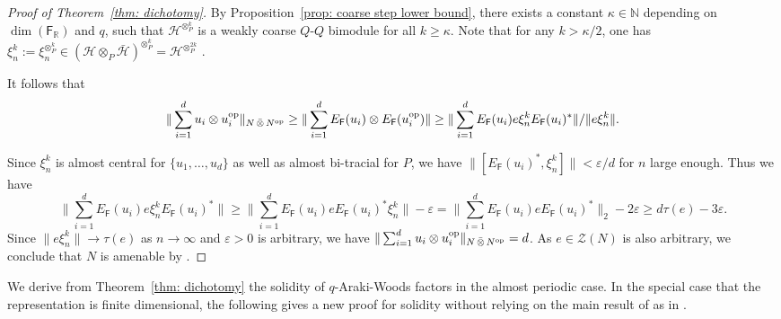 \documentclass[a4paper,11pt]{amsart}
\theoremstyle{definition}
\newtheorem{rem}[thm]{Remark}
\newcommand{\N}{{\mathbb N}}
\newcommand{\R}{{\mathbb R}}
\newcommand{\cH}{{\mathcal H}}
\newcommand{\cM}{{\mathcal M}}
\newcommand{\cO}{{\mathcal O}}
\newcommand{\cU}{{\mathcal U}}
\newcommand{\cZ}{{\mathcal Z}}
\newcommand{\sH}{\mathsf{H}}
\newcommand{\sF}{\mathsf{F}}
\newcommand{\ot}{\otimes}
\newcommand{\ovt}{\, \bar{\otimes}\,}
\newcommand{\op}{{\rm op}}
\begin{document}
\begin{proof}[Proof of Theorem~\ref{thm: dichotomy}]
By Proposition~\ref{prop: coarse step lower bound}, there exists a constant $\kappa\in \N$ depending on $\dim(\sF_\R)$ and $q$,
	such that $\cH^{\ot_P^k}$ is a weakly coarse $Q$-$Q$ bimodule for all $k\geq \kappa$.
Note that for any $k>\kappa/2$, one has 
	$\xi_n^k:=\xi_n^{\ot_P^k}\in (\cH\ot_P \bar \cH)^{\ot_P^k}=\cH^{\ot_P ^{2k}}$	.
		
It follows that
\[
\begin{aligned}
\|\sum_{i=1}^d u_i\ot u_i^\op\|_{N\ovt N^\op}\geq \|\sum_{i=1}^d E_\sF( u_i)\ot E_\sF(u_i^\op)\|\geq \|\sum_{i=1}^d E_\sF (u_i)e\xi_n^{k} E_\sF(u_i)^*\|/\|e\xi_n^k\|.
\end{aligned}
\]


Since $\xi_n^{k}$ is almost central for $\{u_1,\dots, u_d\}$ as well as almost bi-tracial for $P$, 
	we have $\|[E_\sF(u_i)^*,\xi_n^{k}]\|<\varepsilon/d$ for $n$ large enough.
Thus we have
$$
\|\sum_{i=1}^d E_\sF (u_i)e\xi_n^{k} E_\sF(u_i)^*\|\geq \|\sum_{i=1}^d E_\sF(u_i) e E_\sF(u_i)^*\xi_n^{k}\|-\varepsilon=\|\sum_{i=1}^d E_\sF(u_i) e E_\sF(u_i)^*\|_2-2\varepsilon\geq d\tau(e)-3\varepsilon.
$$
Since $\|e\xi_n^k\|\to \tau(e)$ as $n\to \infty$ and $\varepsilon>0$ is arbitrary, we have $\|\sum_{i=1}^d u_i\ot u_i^\op\|_{N\ovt N^\op}=d$.
As $e\in \cZ(N)$ is also arbitrary, we conclude that $N$ is amenable by \cite{Ha85}.
\end{proof}

%


We derive from Theorem~\ref{thm: dichotomy} the solidity of $q$-Araki-Woods factors in the almost periodic case.
In the special case that the representation is finite dimensional,	
	the following gives a new proof for solidity
	without relying on the main result of \cite{Ku22} as in \cite{KSW23}.
\end{document}

